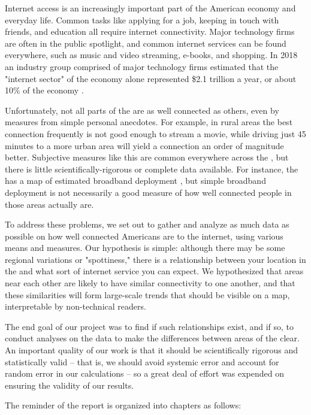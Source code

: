 Internet access is an increasingly important part of the American economy and everyday life. Common tasks like applying for a job, keeping in touch with friends, and education all require internet connectivity. Major technology firms are often in the public spotlight, and common internet services can be found everywhere, such as music and video streaming, e-books, and shopping. In 2018 an industry group comprised of major technology firms estimated that the "internet sector" of the economy alone represented \$2.1 trillion a year, or about 10\% of the \us economy \cite{Shepardson2019a}.

Unfortunately, not all parts of the \us are as well connected as others, even by measures from simple personal anecdotes. For example, in rural areas the best connection frequently is not good enough to stream a movie, while driving just 45 minutes to a more urban area will yield a connection an order of magnitude better. Subjective measures like this are common everywhere across the \us, but there is little scientifically-rigorous or complete data available. For instance, the \fcc has a map of estimated broadband deployment \cite{FederalCommunicationsCommission}, but simple broadband deployment is not necessarily a good measure of how well connected people in those areas actually are.

To address these problems, we set out to gather and analyze as much data as possible on how well connected Americans are to the internet, using various means and measures. Our hypothesis is simple: although there may be some regional variations or "spottiness," there is a relationship between your location in the \us and what sort of internet service you can expect. We hypothesized that areas near each other are likely to have similar connectivity to one another, and that these similarities will form large-scale trends that should be visible on a map, interpretable by non-technical readers.

The end goal of our project was to find if such relationships exist, and if so, to conduct analyses on the data to make the differences between areas of the \us clear. An important quality of our work is that it should be scientifically rigorous and statistically valid -- that is, we should avoid systemic error and account for random error in our calculations -- so a great deal of effort was expended on ensuring the validity of our results.

The reminder of the report is organized into chapters as follows:

